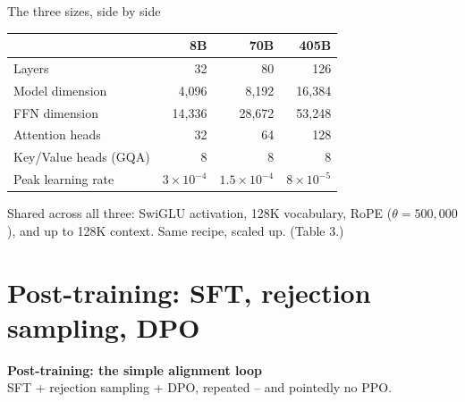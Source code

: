 \documentclass[aspectratio=169]{beamer}
\begin{document}
\begin{frame}{The three sizes, side by side}
  \small
  \renewcommand{\arraystretch}{1.2}
  \begin{center}
  \begin{tabular}{l r r r}
    \toprule
    & \textbf{8B} & \textbf{70B} & \textbf{405B}\\
    \midrule
    Layers                & 32 & 80 & 126\\
    Model dimension       & 4{,}096 & 8{,}192 & 16{,}384\\
    FFN dimension         & 14{,}336 & 28{,}672 & 53{,}248\\
    Attention heads       & 32 & 64 & 128\\
    Key/Value heads (GQA) & 8 & 8 & 8\\
    Peak learning rate    & $3{\times}10^{-4}$ & $1.5{\times}10^{-4}$ & $8{\times}10^{-5}$\\
    \bottomrule
  \end{tabular}
  \end{center}
  \vskip 6pt
  \footnotesize Shared across all three: SwiGLU activation, 128K vocabulary, RoPE
  ($\theta = 500{,}000$), and up to 128K context. Same recipe, scaled up. (Table 3.)
\end{frame}

\section{Post-training: SFT, rejection sampling, DPO}

\begin{frame}[plain]
  \vfill
  \begin{center}
    {\color{popblue}\Large\bfseries Post-training: the simple alignment loop}\\[4pt]
    \small SFT + rejection sampling + DPO, repeated -- and pointedly no PPO.
  \end{center}
  \vfill
\end{frame}
\end{document}
